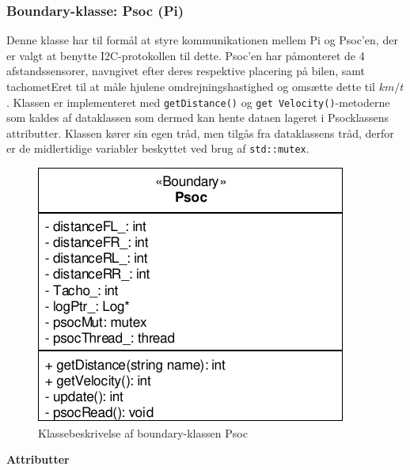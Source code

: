 \subsubsection{Boundary-klasse: Psoc (Pi)}

Denne klasse har til formål at styre kommunikationen mellem Pi og Psoc'en, der er valgt at benytte I2C-protokollen til dette. Psoc'en har påmonteret de 4 afstandssensorer, navngivet efter deres respektive placering på bilen, samt tachometEret til at måle hjulene omdrejningshastighed og omsætte dette til $km/t$. Klassen er implementeret med \texttt{getDistance()} og \texttt{get Velocity()}-metoderne som kaldes af dataklassen som dermed kan hente dataen lageret i Psocklassens attributter. Klassen kører sin egen tråd, men tilgås fra dataklassens tråd, derfor er de midlertidige variabler beskyttet ved brug af \texttt{std::mutex}.

\begin{figure}[h]
\centering
\includegraphics[]{../fig/diagrammer/bil/cd_psoc.pdf}
\caption{Klassebeskrivelse af boundary-klassen Psoc}
\label{fig:cd_psoc}
\end{figure}

\textbf{Attributter}

